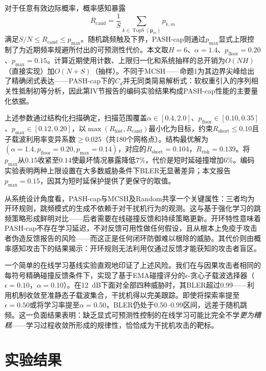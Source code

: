 \documentclass[lettersize,journal]{IEEEtran}
\begin{document}
对于任意有效边际概率，概率感知暴露
\begin{equation}
R_{\mathrm{cand}}=\frac{1}{S}\sum_{k\in\operatorname{TopS}(\boldsymbol p_m)}
p_{k,m}
\end{equation}
满足$S/N\leq R_{\mathrm{cand}}\leq p_{\max}$。随机跳频触及下界，PASH-cap则通过$p_{\max}$显式上限控制了为近期频率规避所付出的可预测性代价。本文取$H=6$、$\alpha=1.4$、$p_{\mathrm{floor}}=0.20$、$p_{\max}=0.15$。计算近期使用计数、上限归一化和系统抽样的总开销为$O(NH)$（直接实现）加$O(N+S)$（抽样）。不同于MCSH——命题1为其边界尖峰给出了精确闭式表达——PASH-cap下的$C_d$并无同类简易解析式：软权重引入的序列相关性抵制初等分析，因此第IV节报告的编码实验结果构成PASH-cap性能的主要量化依据。

上述参数通过结构化扫描确定，扫描范围覆盖$\alpha\in[0.4,2.0]$、$p_{\mathrm{floor}}\in[0.10,0.35]$、$p_{\max}\in[0.12,0.20]$，以$\max(R_{\mathrm{hist}},R_{\mathrm{cand}})$最小化为目标，约束$R_{\mathrm{short}}\leq0.10$且子载波利用率变异系数$\geq0.025$（共180个网格点）。结构最优解为$(\alpha{=}1.4,p_{\mathrm{floor}}{=}0.20,p_{\max}{=}0.14)$，对应的$R_{\mathrm{short}}{=}0.104$，$R_{\mathrm{risk}}{=}0.139$。将$p_{\max}$从$0.15$收紧至$0.14$使最坏情况暴露降低$7\%$，代价是短时延碰撞增加$6\%$。编码实验表明两种上限设置在大多数威胁条件下BLER无显著差异；本文报告$p_{\max}{=}0.15$，因其为短时延保护提供了更保守的取值。

从系统设计角度看，PASH-cap与MCSH及Random共享一个关键属性：三者均为开环规则，跳频模式的生成不依赖于对干扰机行为的观测。这与基于强化学习的跳频策略形成鲜明对比——后者需要在线碰撞反馈和持续策略更新。开环特性意味着PASH-cap不存在学习延迟，不对反馈可用性做任何假设，且从根本上免疫于攻击者伪造反馈报告的风险——而这正是任何闭环防御难以根除的威胁。其代价则由概率感知攻击下的结果揭示：开环规则无法利用仅通过反馈才能获知的攻击者盲区。

一个简单的在线学习基线实验直观地印证了上述风险。我们在与因果攻击者相同的每符号精确碰撞反馈条件下，实现了基于EMA碰撞评分的$\epsilon$-贪心子载波选择器（$\epsilon{=}0.10$，$\alpha{=}0.10$）。在12~dB下面对全部四种威胁时，其BLER超过0.99——利用机制收敛至准静态子载波集合，干扰机得以完美跟踪。即使将探索率提至$\epsilon{=}0.50$或将学习率提至$\alpha{=}0.50$，BLER仍处于0.50--0.99区间，远差于随机跳频。这一负面结果表明：缺乏显式可预测性控制的在线学习可能比完全不学\emph{更为糟糕}——学习过程收敛所形成的规律性，恰恰成为干扰机攻击的靶标。

\section{实验结果}
\end{document}
